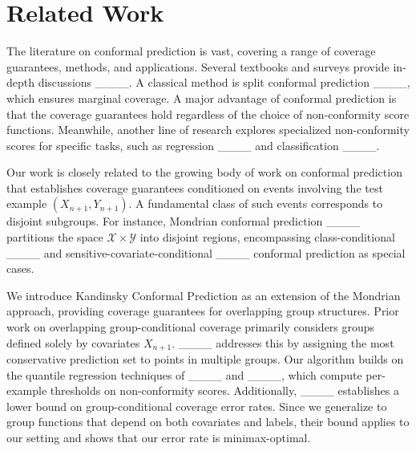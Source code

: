 \section{Related Work}


The literature on conformal prediction is vast, covering a range of coverage guarantees, methods, and applications. Several textbooks and surveys provide in-depth discussions ____. A classical method is split conformal prediction ____, which ensures marginal coverage. A major advantage of conformal prediction is that the coverage guarantees hold regardless of the choice of non-conformity score functions. Meanwhile, another line of research explores specialized non-conformity scores for specific tasks, such as regression ____ and classification ____.


Our work is closely related to the growing body of work on conformal prediction that establishes coverage guarantees conditioned on events involving the test example $(X_{n+1}, Y_{n+1})$. A fundamental class of such events corresponds to disjoint subgroups. For instance, Mondrian conformal prediction ____ partitions the space  $\mathcal{X} \times \mathcal{Y}$ into disjoint regions, encompassing class-conditional ____ and sensitive-covariate-conditional ____ conformal prediction as special cases. 

We introduce Kandinsky Conformal Prediction as an extension of the Mondrian approach, providing coverage guarantees for overlapping group structures. Prior work on overlapping group-conditional coverage primarily considers groups defined solely by covariates  $X_{n+1}$. ____ addresses this by assigning the most conservative prediction set to points in multiple groups. Our algorithm builds on the quantile regression techniques of ____ and ____, which compute per-example thresholds on non-conformity scores. Additionally, ____ establishes a lower bound on group-conditional coverage error rates. Since we generalize to group functions that depend on both covariates and labels, their bound applies to our setting and shows that our error rate is minimax-optimal.


